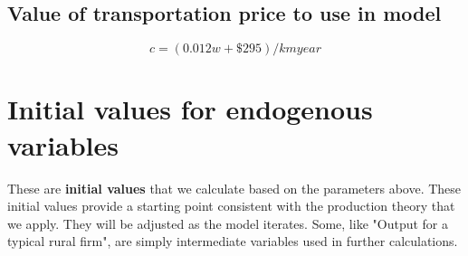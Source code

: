 \subsection{Value of transportation price to use in model}
\[ {c}=(0.012 w+ \$295)/km year \]


\section{Initial values for endogenous variables} \label{sec-init-value-list}

These are \textbf{initial values} that we calculate based on the parameters above. These initial values provide  a starting point consistent with the production theory that we apply. They will be adjusted as the model iterates.  Some, like "Output for a typical rural firm", are simply intermediate variables used in further calculations.%



